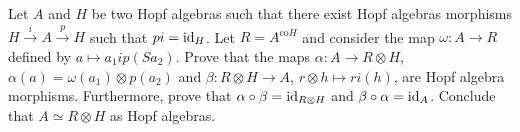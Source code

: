 \begin{exercise}
Let $A$ and $H$ be two Hopf algebras such that there exist Hopf algebras
morphisms $H\xrightarrow{i}A\xrightarrow{p}H$ such that $pi=\mathrm{id}_H$. Let
$R=A^{\mathrm{co}H}$ and consider the map $\omega:A\to R$ defined by $a\mapsto
a_1ip(Sa_2)$. Prove that the maps $\alpha:A\to R\otimes H$,
$\alpha(a)=\omega(a_1)\otimes p(a_2)$ and $\beta:R\otimes H\to A$, $r\otimes
h\mapsto ri(h)$, are Hopf algebra morphisms. Furthermore, prove that
$\alpha\circ\beta=\mathrm{id}_{R\otimes H}$ and $\beta\circ\alpha=\mathrm{id}_A$. Conclude
that $A\simeq R\otimes H$ as Hopf algebras.
\end{exercise}
